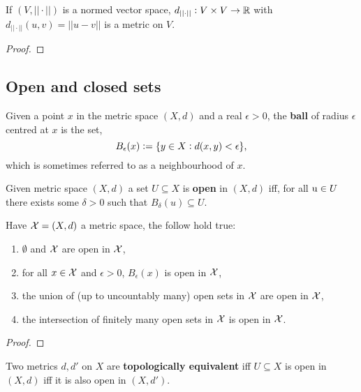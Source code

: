 \documentclass[../Year2.tex]{subfiles}
\begin{document}
\begin{lemma}
    If $(V,||\cdot||)$ is a normed vector space, $d_{||\cdot||}:V\times V\rightarrow\mathbb{R}$ with $d_{||\cdot||}(u,v) = ||u-v||$ is a metric on $V$.
    \begin{proof}
        
    \end{proof}
\end{lemma}

\subsection{Open and closed sets}

\begin{definition}
    Given a point $x$ in the metric space $(X,d)$ and a real $\epsilon>0$, the \textbf{ball} of radius $\epsilon$ centred at $x$ is the set, \[
        B_\epsilon(x) := \{y\in X: d(x,y)<\epsilon\}\text{\textcolor{black}{,}}
    \] which is sometimes referred to as a neighbourhood of $x$.
\end{definition}

\begin{definition}
    Given metric space $(X,d)$ a set $U\subseteq X$ is \textbf{open} in $(X,d)$ iff, for all $\mathrm{u}\in U$ there exists some $\delta>0$ such that $B_\delta(u)\subseteq U$.
\end{definition}

\begin{proposition}
    Have $\mathcal{X}=(X,d)$ a metric space, the follow hold true: \begin{enumerate}
        \item $\emptyset$ and $\mathcal{X}$ are open in $\mathcal{X}$,
        \item for all $x\in\mathcal{X}$ and $\epsilon>0$, $B_\epsilon(x)$ is open in $\mathcal{X}$,
        \item the union of (up to uncountably many) open sets in $\mathcal{X}$ are open in $\mathcal{X}$,
        \item the intersection of finitely many open sets in $\mathcal{X}$ is open in $\mathcal{X}$.
    \end{enumerate}
    \begin{proof}
        
    \end{proof}
\end{proposition}

\begin{definition}
    Two metrics $d,d'$ on $X$ are \textbf{topologically equivalent} iff $U\subseteq X$ is open in $(X,d)$ iff it is also open in $(X,d')$.
\end{definition}
\end{document}
